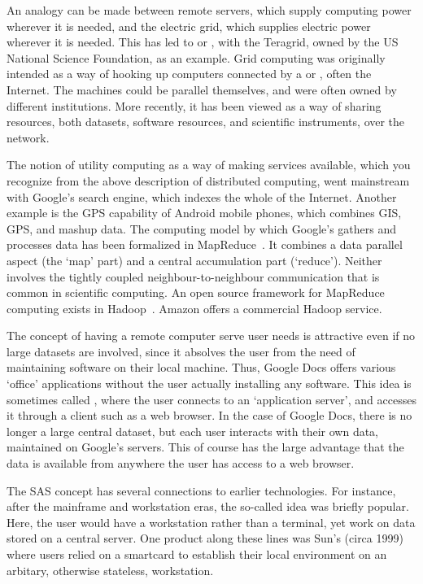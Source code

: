 An analogy can be made between remote servers, which supply computing
power wherever it is needed, and the electric grid, which supplies
electric power wherever it is needed. This has led to  or , with the Teragrid,
owned by the US National Science Foundation, as an example. Grid
computing was originally intended as a way of hooking up computers
connected by a  or , often the Internet. The machines
could be parallel themselves, and were often owned by different
institutions. More recently, it has been viewed as a way of sharing
resources, both datasets, software resources, and scientific
instruments, over the network.

The notion of utility computing as a way of making services available,
which you recognize from the above description of distributed
computing, went mainstream
with Google's search engine, which
indexes the whole of the Internet. Another example is the GPS capability
of Android mobile phones, which combines GIS, GPS, and mashup
data. The computing model by which Google's gathers and processes data
has been formalized in
MapReduce~\cite{Google:mapreduce}. It combines a data parallel aspect (the
`map' part) and a central accumulation part (`reduce'). Neither
involves the tightly coupled neighbour-to-neighbour communication that
is common in scientific computing.
%
An open
source framework for MapReduce computing exists in
Hadoop~\cite{Hadoop-wiki}. Amazon offers a commercial Hadoop service.

The concept of having a remote computer serve user needs is attractive
even if no large datasets are involved, since it absolves the user
from the need of maintaining software on their local machine. Thus,
Google Docs offers various `office'
applications without the user actually installing any software. This
idea is sometimes called , where
the user connects to an `application server', and accesses it through
a client such as a web browser. In the case of Google Docs, there is
no longer a large central dataset, but each user interacts with their
own data, maintained on Google's servers. This of course has the large
advantage that the data is available from anywhere the user has access
to a web browser.

The \ac{SAS} concept has several connections to earlier
technologies. For instance, after the mainframe and workstation eras,
the so-called  idea was briefly popular. Here,
the user would have a workstation rather than a terminal, yet work on
data stored on a central server. One product along these lines was
Sun's  (circa 1999) where users relied on a smartcard to
establish their local environment on an arbitary, otherwise stateless,
workstation.

